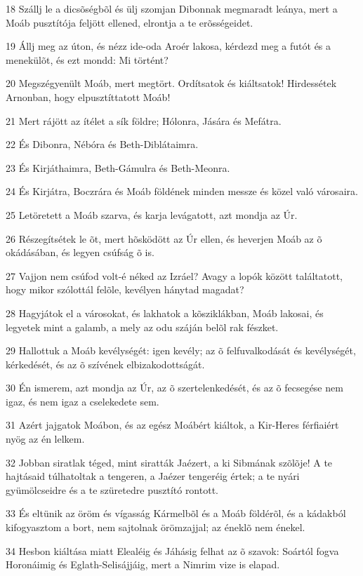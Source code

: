 \par 18 Szállj le a dicsõségbõl és ülj szomjan Dibonnak megmaradt leánya, mert a Moáb pusztítója feljött ellened, elrontja a te erõsségeidet.
\par 19 Állj meg az úton, és nézz ide-oda Aroér lakosa, kérdezd meg a futót és a menekülõt, és ezt mondd: Mi történt?
\par 20 Megszégyenült Moáb, mert megtört. Ordítsatok és kiáltsatok! Hirdessétek Arnonban, hogy elpusztíttatott Moáb!
\par 21 Mert rájött az ítélet a sík földre; Hólonra, Jására és Mefátra.
\par 22 És Dibonra, Nébóra és Beth-Diblátaimra.
\par 23 És Kirjáthaimra, Beth-Gámulra és Beth-Meonra.
\par 24 És Kirjátra, Boczrára és Moáb földének minden messze és közel való városaira.
\par 25 Letöretett a Moáb szarva, és karja levágatott, azt mondja az Úr.
\par 26 Részegítsétek le õt, mert hõsködött az Úr ellen, és heverjen Moáb az õ okádásában, és legyen csúfság õ is.
\par 27 Vajjon nem csúfod volt-é néked az Izráel? Avagy a lopók között találtatott, hogy mikor szólottál felõle, kevélyen hánytad magadat?
\par 28 Hagyjátok el a városokat, és lakhatok a kõsziklákban, Moáb lakosai, és legyetek mint a galamb, a mely az odu száján belõl rak fészket.
\par 29 Hallottuk a Moáb kevélységét: igen kevély; az õ felfuvalkodását és kevélységét, kérkedését, és az õ szívének elbizakodottságát.
\par 30 Én ismerem, azt mondja az Úr, az õ szertelenkedését, és az õ fecsegése nem igaz, és nem igaz a cselekedete sem.
\par 31 Azért jajgatok Moábon, és az egész Moábért kiáltok, a Kir-Heres férfiaiért nyög az én lelkem.
\par 32 Jobban siratlak téged, mint siratták Jaézert, a ki Sibmának szõlõje! A te hajtásaid túlhatoltak a tengeren, a Jaézer tengeréig értek; a te nyári gyümölcseidre és a te szüretedre pusztító rontott.
\par 33 És eltünik az öröm és vígasság Kármelbõl és a Moáb földérõl, és a kádakból kifogyasztom a bort, nem sajtolnak örömzajjal; az éneklõ nem énekel.
\par 34 Hesbon kiáltása miatt Elealéig és Jáhásig felhat az õ szavok: Soártól fogva Horonáimig és Eglath-Selisájjáig, mert a Nimrim vize is elapad.
